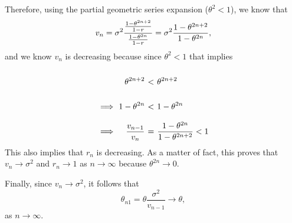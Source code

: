 Therefore, using the partial geometric series expansion ($\theta^2 < 1$), we know that
\[ \everymath{\displaystyle} v_n = \sigma^2 \frac{\frac{1-\theta^{2n+2}}{1-r}}{\frac{1-\theta^{2n}}{1-r}} = \sigma^2\frac{1-\theta^{2n+2}}{1-\theta^{2n}}, \]
and we know $v_n$ is decreasing because since $\theta^2 < 1$ that implies
\[ \everymath{\displaystyle}
\arraycolsep=1.8pt\def\arraystretch{2.5}
\begin{array}{rrcl}
   & \theta^{2n+2} & < & \theta^{2n+2}\\
   \implies & 1-\theta^{2n} & < & 1 -\theta^{2n}\\
   \implies & \frac{v_{n-1}}{v_{n}} & = & \frac{1-\theta^{2n}}{1-\theta^{2n+2}} < 1
\end{array} \]
This also implies that $r_n$ is decreasing. As a matter of fact, this proves that $v_n \to \sigma^2$ and $r_n \to 1$ as $n \to \infty$ because $\theta^{2n} \to 0$.

Finally, since $v_n \to \sigma^2$, it follows that
\[ \theta_{n1} = \theta \frac{\sigma^2}{v_{n-1}} \to \theta, \]
as $n \to \infty$.
